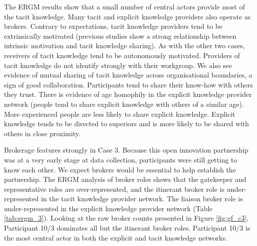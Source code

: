 The ERGM results show that a small number of central actors provide most of the tacit knowledge. Many tacit and explicit knowledge providers also operate as brokers. Contrary to expectations, tacit knowledge providers tend to be extrinsically motivated (previous studies show a strong relationship between intrinsic motivation and tacit knowledge sharing). As with the other two cases, receivers of tacit knowledge tend to be autonomously motivated. Providers of tacit knowledge do not identify strongly with their workgroup. We also see evidence of mutual sharing of tacit knowledge across organisational boundaries, a sign of good collaboration. Participants tend to share their know-how with others they trust. There is evidence of age homophily in the explicit knowledge provider network (people tend to share explicit knowledge with others of a similar age). More experienced people are less likely to share explicit knowledge. Explicit knowledge tends to be directed to superiors and is more likely to be shared with others in close proximity. \medskip

Brokerage features strongly in Case 3. Because this open innovation partnership was at a very early stage at data collection, participants were still getting to know each other. We expect brokers would be essential to help establish the partnership. The ERGM analysis of broker roles shows that the gatekeeper and representative roles are over-represented, and the itinerant broker role is under-represented in the tacit knowledge provider network. The liaison broker role is under-represented in the explicit knowledge provider network (Table \ref{tab:ergm_3}). Looking at the raw broker counts presented in Figure \ref{fig:gf_c3}, Participant 10/3 dominates all but the itinerant broker roles. Participant 10/3 is the most central actor in both the explicit and tacit knowledge networks.

